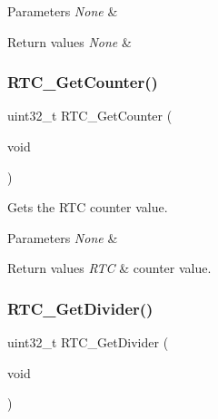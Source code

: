 \begin{DoxyParams}{Parameters}
{\em None} & \\
\hline
\end{DoxyParams}

\begin{DoxyRetVals}{Return values}
{\em None} & \\
\hline
\end{DoxyRetVals}
\mbox{\label{group___r_t_c___private___functions_ga6edb19a0ad8414a40610341121c5ea6c}} 
\subsubsection{\texorpdfstring{RTC\_GetCounter()}{RTC\_GetCounter()}}
{\footnotesize\ttfamily uint32\+\_\+t R\+T\+C\+\_\+\+Get\+Counter (\begin{DoxyParamCaption}\item[{void}]{ }\end{DoxyParamCaption})}



Gets the R\+TC counter value. 


\begin{DoxyParams}{Parameters}
{\em None} & \\
\hline
\end{DoxyParams}

\begin{DoxyRetVals}{Return values}
{\em R\+TC} & counter value. \\
\hline
\end{DoxyRetVals}
\mbox{\label{group___r_t_c___private___functions_gaa4f00e0469fedcf6cbf23760e6d801ed}} 
\subsubsection{\texorpdfstring{RTC\_GetDivider()}{RTC\_GetDivider()}}
{\footnotesize\ttfamily uint32\+\_\+t R\+T\+C\+\_\+\+Get\+Divider (\begin{DoxyParamCaption}\item[{void}]{ }\end{DoxyParamCaption})}



